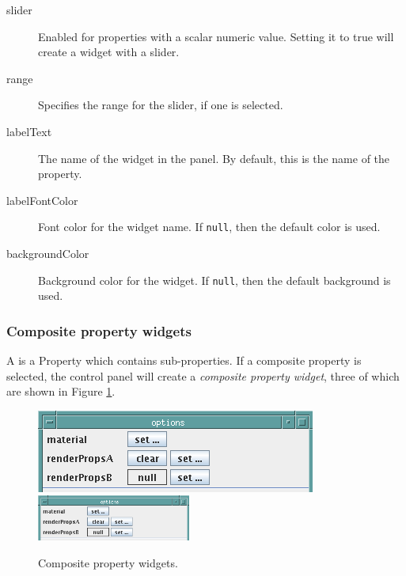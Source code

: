 \documentclass{article}
\begin{document}
\begin{description}

\item[slider]\mbox{}

Enabled for properties with a scalar numeric value.
Setting it to true will create a widget with a slider.

\item[range]\mbox{}

Specifies the range for the slider, if one is selected.

\item[labelText]\mbox{}

The name of the widget in the panel. By default, this is the
name of the property.

\item[labelFontColor]\mbox{}

Font color for the widget name. If {\tt null}, then the default color 
is used.

\item[backgroundColor]\mbox{}

Background color for the widget. If {\tt null}, then the default 
background is used.

\end{description}

\subsubsection{Composite property widgets}


A  is a Property which contains
sub-properties. If a composite property is selected, the control panel
will create a {\it composite property widget}, three of which are shown in
Figure \ref{compositePropWidgetsFig}.

\begin{figure}
\begin{center}
\iflatexml
\includegraphics[]{images/compositePropWidgets}
\else
\includegraphics[width=0.45\textwidth]{images/compositePropWidgets}
\fi
\end{center}
\caption{Composite property widgets.}%
\label{compositePropWidgetsFig}
\end{figure}
\end{document}
